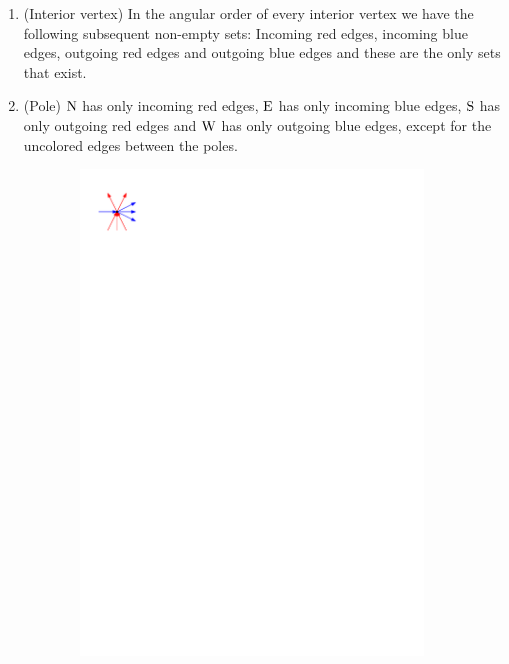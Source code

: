   \begin{enumerate}
    \item (Interior vertex) In the angular order of every interior vertex we have the following subsequent non-empty sets: Incoming red edges, incoming blue edges, outgoing red edges and outgoing blue edges and these are the only sets that exist.
    \item (Pole) $\mathrm{N}$ has only incoming red edges, $\mathrm{E}$ has only incoming blue edges, $\mathrm{S}$ has only outgoing red edges and $\mathrm{W}$ has only outgoing blue edges, except for the uncolored edges between the poles.
  \end{enumerate}

  \begin{figure}
      \centering
      \begin{subfigure}[b]{0.2 \textwidth}
          \includegraphics[width = \textwidth]{rectangularDuals/img/interiorcondition.pdf}

\end{subfigure}
\end{figure}
